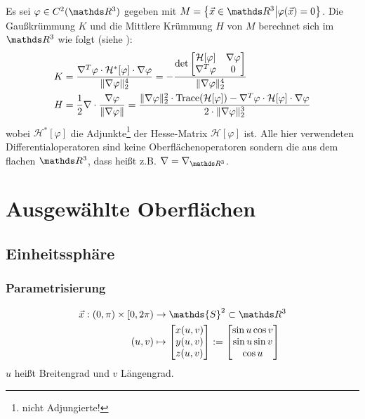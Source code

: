  Es sei \( \varphi\in C^{2}(\R^{3}) \) gegeben mit \( M = \left\{ \vec{x}\in\R^{3} \middle| \varphi(\vec{x}) = 0 \right\} \).
  Die Gaußkrümmung \( K \) und die Mittlere Krümmung \( H \) von \( M \) berechnet sich im \( \R^{3} \) wie folgt (siehe \cite{CurvatureFormulas}):
  \begin{align}
    K &= \frac{\nabla^{T}\varphi \cdot \mathcal{H}^{*}[\varphi] \cdot \nabla\varphi}{ \|\nabla\varphi\|_{2}^{4}}
                 = - \frac{\det \begin{bmatrix} \mathcal{H}[\varphi] & \nabla\varphi \\ \nabla^{T}\varphi & 0 \end{bmatrix}}{\|\nabla\varphi\|_{2}^{4}} \\
    H &= \frac{1}{2}\nabla \cdot \frac{\nabla\varphi}{\|\nabla\varphi\|}
          = \frac{\|\nabla\varphi\|_{2}^{2}\cdot\text{Trace}(\mathcal{H}[\varphi]) - \nabla^{T}\varphi \cdot \mathcal{H}[\varphi] \cdot \nabla\varphi }
                        {2\cdot\|\nabla\varphi\|_{2}^{3}}
  \end{align}
  wobei \( \mathcal{H}^{*}[\varphi] \) die Adjunkte\footnote{nicht Adjungierte!} der Hesse-Matrix \( \mathcal{H}[\varphi] \) ist.
  Alle hier verwendeten Differentialoperatoren sind keine Oberflächenoperatoren sondern die aus dem flachen \( \R^{3} \), dass heißt z.B.
  \( \nabla = \nabla_{\R^{3}} \).


\section{Ausgewählte Oberflächen}

  \subsection{Einheitssphäre}
    \label{sphere}

    \subsubsection{Parametrisierung}
      \begin{align}
      \begin{aligned}
        \vec{x}: \left( 0, \pi \right) \times \left[ 0 , 2\pi \right)
                    &\rightarrow \mathds{S}^{2} \subset \R^{3} \\
             \left( u,v \right) 
                    &\mapsto\begin{bmatrix}
                              x(u,v) \\ y(u,v) \\ z(u,v)
                            \end{bmatrix}
                    := \begin{bmatrix}
                        \sin u \cos v \\
                        \sin u \sin v \\
                        \cos u
                      \end{bmatrix}
      \end{aligned}
      \end{align}
      \( u \) heißt Breitengrad und \( v \) Längengrad.

